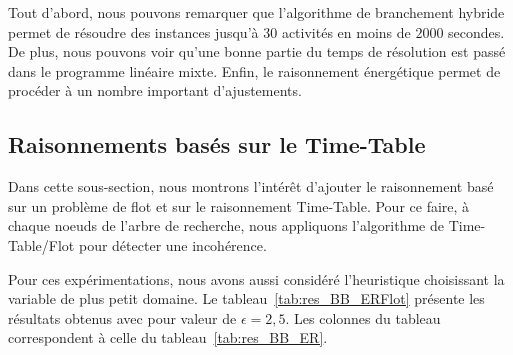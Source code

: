 Tout d'abord, nous pouvons remarquer que l'algorithme de branchement
hybride permet de résoudre des instances jusqu'à $30$ activités en
moins de $2000$ secondes. De plus, nous pouvons voir qu'une bonne
partie du temps de résolution est passé dans le programme linéaire
mixte. Enfin, le raisonnement énergétique permet de procéder à un
nombre important d'ajustements. 

\subsection{Raisonnements basés sur le Time-Table}
\label{sec:expe_TT}

Dans cette sous-section, nous montrons l'intérêt d'ajouter le
raisonnement basé sur un problème de flot et sur le raisonnement
Time-Table. Pour ce faire, à chaque noeuds de l'arbre de recherche,
nous appliquons l'algorithme de Time-Table/Flot pour détecter une
incohérence. 

Pour ces expérimentations, nous avons aussi considéré l'heuristique
choisissant la variable de plus petit domaine. Le
tableau~\ref{tab:res_BB_ERFlot} présente les résultats obtenus avec
pour valeur de $\epsilon=2,5$. Les colonnes du tableau correspondent
à celle du tableau~\ref{tab:res_BB_ER}.

